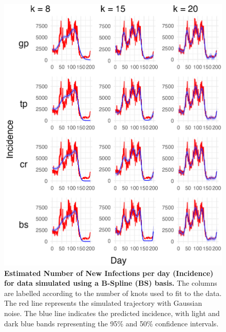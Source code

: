 \documentclass[
11pt, %
oneside, %
english, %
singlespacing, %
]{macthesis} %
\begin{document}
\begin{figure}[H]
\centering
\includegraphics[width=\textwidth]{figure/Simulated/unaggregated/simulation_bs_20_k(5,10,20)_bsd1_beta1_plot_incidence.png}
\caption[Predicted Simulated Data (BS) Incidence]{\textbf{Estimated Number of New Infections per day (Incidence) for data simulated using a B-Spline (BS) basis.} The columns are labelled according to the number of knots used to fit to the data. The red line represents the simulated trajectory with Gaussian noise. The blue line indicates the predicted incidence, with light and dark blue bands representing the 95\% and 50\% confidence intervals.}
\label{fig:incidence20bs}
\end{figure}
\end{document}
